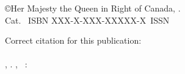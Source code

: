 %
%
\clearpage

\null

\vfill

\begin{center}
\copyright Her Majesty the Queen in Right of Canada, \publicationyearofthereport.\\
Cat. \catofthereport~ISBN XXX-X-XXX-XXXXX-X~ISSN \ISSNofthereport
\end{center}

\vfill

\noindent
Correct citation for this publication:\\
\\
\noindent
\authorsofthereport, \publicationyearofthereport. \titleofthereport, \journalofthereport\ \serialofthereport: \pagesofthereport